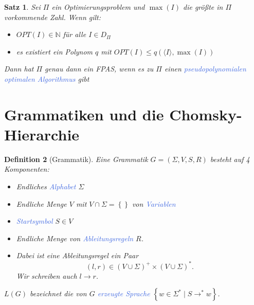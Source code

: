 \documentclass[11pt]{article}
\newcommand{\tcol}[1]{\textcolor{RoyalBlue}{#1}}
\newcommand{\set}[1]{\left\lbrace #1\right\rbrace}
\theoremstyle{break}
\newtheorem{satz}{Satz}[section]
\newtheorem{defi}[satz]{Definition}
\begin{document}
    \begin{satz}
        Sei $\Pi$ ein Optimierungsproblem und $\max(I)$ die größte in $\Pi$ vorkommende Zahl.
        Wenn gilt:
        \begin{itemize}
            \item $OPT(I)\in\mathbb{N}$ für alle $I\in D_\Pi$
            \item es existiert ein Polynom $q$ mit $OPT(I)\leq q(\langle I\rangle,\max(I))$
        \end{itemize}
        Dann hat $\Pi$ genau dann ein FPAS, wenn es zu $\Pi$ einen \tcol{pseudopolynomialen optimalen Algorithmus} gibt
    \end{satz}



    \section{Grammatiken und die Chomsky-Hierarchie}
	\label{sec:grammatiken-und-die-chomsky-hierarchieindex}


    \begin{defi}[Grammatik]
        Eine Grammatik $G=(\Sigma,V,S,R)$ besteht auf 4 Komponenten:
        \begin{itemize}
            \item Endliches \tcol{Alphabet} $\Sigma$
            \item Endliche Menge $V$ mit $V\cap\Sigma=\set{}$ von \tcol{Variablen}
            \item \tcol{Startsymbol} $S\in V$
            \item Endliche Menge von \tcol{Ableitungsregeln} $R$.
            \item Dabei ist eine Ableitungsregel ein Paar \[(l,r)\in(V\cup\Sigma)^+\times(V\cup\Sigma)^*.\]
            Wir schreiben auch $l\rightarrow r$.
        \end{itemize}
        $L(G)$ bezeichnet die von $G$ \tcol{erzeugte Sprache} $\set{w\in\Sigma^*\mid S\rightarrow^*w}$.
    \end{defi}
\end{document}
